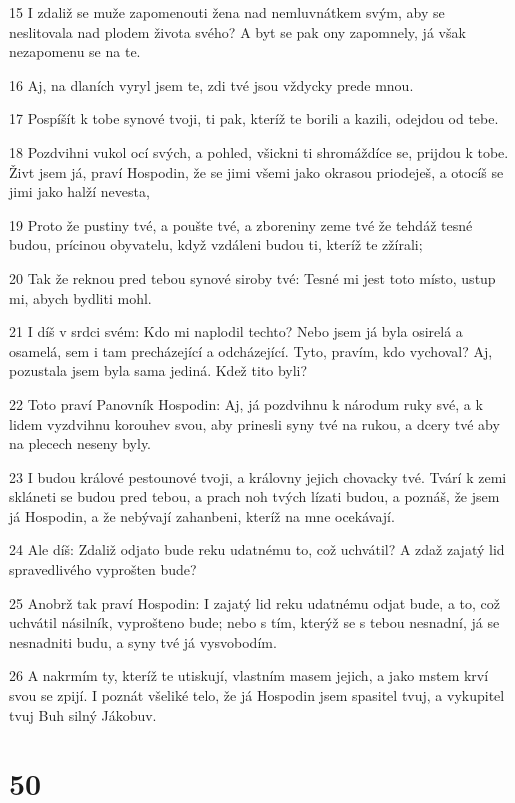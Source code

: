 \par 15 I zdaliž se muže zapomenouti žena nad nemluvnátkem svým, aby se neslitovala nad plodem života svého? A byt se pak ony zapomnely, já však nezapomenu se na te.
\par 16 Aj, na dlaních vyryl jsem te, zdi tvé jsou vždycky prede mnou.
\par 17 Pospíšít k tobe synové tvoji, ti pak, kteríž te borili a kazili, odejdou od tebe.
\par 18 Pozdvihni vukol ocí svých, a pohled, všickni ti shromáždíce se, prijdou k tobe. Živt jsem já, praví Hospodin, že se jimi všemi jako okrasou priodeješ, a otocíš se jimi jako halží nevesta,
\par 19 Proto že pustiny tvé, a poušte tvé, a zboreniny zeme tvé že tehdáž tesné budou, prícinou obyvatelu, když vzdáleni budou ti, kteríž te zžírali;
\par 20 Tak že reknou pred tebou synové siroby tvé: Tesné mi jest toto místo, ustup mi, abych bydliti mohl.
\par 21 I díš v srdci svém: Kdo mi naplodil techto? Nebo jsem já byla osirelá a osamelá, sem i tam precházející a odcházející. Tyto, pravím, kdo vychoval? Aj, pozustala jsem byla sama jediná. Kdež tito byli?
\par 22 Toto praví Panovník Hospodin: Aj, já pozdvihnu k národum ruky své, a k lidem vyzdvihnu korouhev svou, aby prinesli syny tvé na rukou, a dcery tvé aby na plecech neseny byly.
\par 23 I budou králové pestounové tvoji, a královny jejich chovacky tvé. Tvárí k zemi skláneti se budou pred tebou, a prach noh tvých lízati budou, a poznáš, že jsem já Hospodin, a že nebývají zahanbeni, kteríž na mne ocekávají.
\par 24 Ale díš: Zdaliž odjato bude reku udatnému to, což uchvátil? A zdaž zajatý lid spravedlivého vyprošten bude?
\par 25 Anobrž tak praví Hospodin: I zajatý lid reku udatnému odjat bude, a to, což uchvátil násilník, vyprošteno bude; nebo s tím, kterýž se s tebou nesnadní, já se nesnadniti budu, a syny tvé já vysvobodím.
\par 26 A nakrmím ty, kteríž te utiskují, vlastním masem jejich, a jako mstem krví svou se zpijí. I poznát všeliké telo, že já Hospodin jsem spasitel tvuj, a vykupitel tvuj Buh silný Jákobuv.

\chapter{50}

